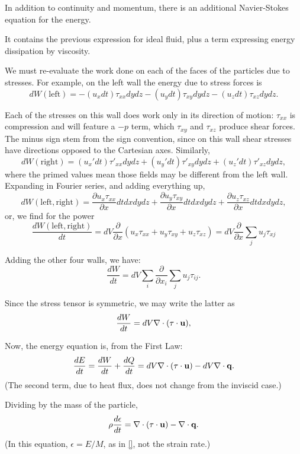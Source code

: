 In addition to continuity and momentum, there is an additional
Navier-Stokes equation for the energy.

It contains the previous expression for ideal fluid, plus a term
expressing energy dissipation by viscosity.

We must re-evaluate the work done on each of the faces of the
particles due to stresses. For example, on the left wall the energy
due to stress forces is
\[
dW(\mathrm{left})  =
 -(u_x dt)   \tau_{xx} dy dz
 -(u_y dt)   \tau_{xy} dy dz
 -(u_z dt)   \tau_{xz} dy dz .
\]

Each of the stresses on this wall does work only in its direction of
motion: $\tau_{xx}$ is compression and will feature a $-p$ term, which
$\tau_{xy}$ and $\tau_{xz}$ produce shear forces. The minus sign stem
from the sign convention, since on this wall shear stresses have
directions opposed to the Cartesian axes. Similarly,
\[
dW(\mathrm{right})  =
 (u_x' dt)   \tau'_{xx}  dy dz
+(u_y' dt)   \tau'_{xy} dy dz
+(u_z' dt)   \tau'_{xz} dy dz ,
\]
where the primed values mean those fields may be different from the
left wall. Expanding in Fourier series, and adding everything up,
\[
dW(\mathrm{left,right})  =
 \frac{\partial u_x \tau_{xx}}{\partial x}  dt dx  dy dz  +
 \frac{\partial u_y \tau_{xy}}{\partial x}  dt dx  dy dz  +
 \frac{\partial u_z \tau_{xz}}{\partial x}  dt dx  dy dz ,
 \]
or, we find for the power
\[
\frac{dW(\mathrm{left,right})}{dt}  =
dV 
\frac{\partial }{\partial x}
\left(
 u_x \tau_{xx} +
 u_y \tau_{xy} +
 u_z \tau_{xz}
 \right) =
dV 
\frac{\partial }{\partial x}
\sum_j u_j \tau_{xj}
\]

Adding the other four walls, we have:
\[
\frac{dW}{dt}  =
dV
 \sum_i \frac{\partial }{\partial x_i} \sum_j u_j \tau_{ij} .
\]

Since the stress tensor is symmetric, we may write the latter as
\[
\frac{dW}{dt}  =
dV
\nabla\cdot ( \tau \cdot  \mathbf{u} ) ,
\]

Now, the energy equation is, from the First Law:
\[
\frac{dE}{dt}  = \frac{dW}{dt} + \frac{dQ}{dt} =
dV \nabla\cdot ( \tau \cdot  \mathbf{u} ) - dV\nabla\cdot\mathbf{q} .
\]
(The second term, due to heat flux, does not change from the inviscid
case.)

Dividing by the mass of the particle,
\begin{equation}
\label{eq:NS_en_2}
\rho \frac{d \epsilon }{dt}  = 
 \nabla\cdot ( \tau \cdot  \mathbf{u} ) - \nabla\cdot\mathbf{q} .
\end{equation}
(In this equation, $\epsilon=E/M$, as in \ref{}, not the strain rate.)

